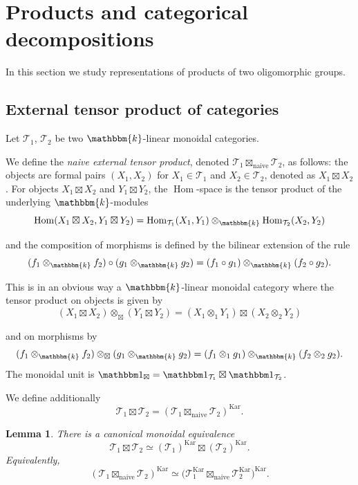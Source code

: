\documentclass[11pt,a4paper]{amsart}
\theoremstyle{plain}%
\newtheorem{lemma}{Lemma}[subsection]
\theoremstyle{definition}
\theoremstyle{remark}
\newcommand{\Hom}{\operatorname{Hom}}
\newcommand{\triv}{{\mathbbm 1}}
\newcommand{\kk}{\mathbbm{k}}
\newcommand{\Kar}{\mathrm{Kar}}
\begin{document}

\section{Products and categorical decompositions}

In this section we study representations of products of two oligomorphic groups.



\subsection{External tensor product of categories}


Let $\mathcal{T}_1$, $\mathcal{T}_2$ be two $\kk$-linear monoidal categories.

We define the \emph{naive external tensor product}, denoted $\mathcal{T}_1 \boxtimes_{\mathrm{naive}} \mathcal{T}_2$, as follows: the objects are formal pairs $(X_1, X_2)$ for $X_1 \in \mathcal{T}_1$ and $X_2 \in \mathcal{T}_2$, denoted as $X_1 \boxtimes X_2$. For objects $X_1 \boxtimes X_2$ and $Y_1 \boxtimes Y_2$, the $\Hom$-space is the tensor product of the underlying $\kk$-modules
\[ \Hom(X_1 \boxtimes X_2, Y_1 \boxtimes Y_2) = \Hom_{\mathcal{T}_1}(X_1, Y_1) \otimes_\kk \Hom_{\mathcal{T}_2}(X_2, Y_2)\]

and the composition of morphisms is defined by the bilinear extension of the rule
\[(f_1 \otimes_\kk f_2) \circ (g_1 \otimes_\kk g_2) = (f_1 \circ g_1) \otimes_\kk (f_2 \circ g_2).\]

This is in an obvious way a $\kk$-linear monoidal category where the tensor product on objects is given by
\[(X_1 \boxtimes X_2) \otimes_{\boxtimes} (Y_1 \boxtimes Y_2) = (X_1 \otimes_1 Y_1) \boxtimes (X_2 \otimes_2 Y_2)\]

and on morphisms by 
\[(f_1 \otimes_\kk f_2) \otimes_{\boxtimes} (g_1 \otimes_\kk g_2) = (f_1 \otimes_1 g_1) \otimes_\kk (f_2 \otimes_2 g_2).\] The monoidal unit is $\triv_{\boxtimes} = \triv_{\mathcal{T}_1} \boxtimes \triv_{\mathcal{T}_2}$.

We define additionally \[\mathcal{T}_1 \boxtimes \mathcal{T}_2 = (\mathcal{T}_1 \boxtimes_{\mathrm{naive}} \mathcal{T}_2)^{\Kar}.\]

\begin{lemma}\label{lem:external-kar}
There is a canonical monoidal equivalence \[ \mathcal{T}_1\boxtimes\mathcal{T}_2 \simeq (\mathcal{T}_1)^{\Kar}\boxtimes (\mathcal{T}_2)^{\Kar}.\]
Equivalently, \[(\mathcal{T}_1\boxtimes_{\mathrm{naive}}\mathcal{T}_2)^{\Kar}
\simeq \bigl(\mathcal{T}_1^{\Kar}\boxtimes_{\mathrm{naive}}\mathcal{T}_2^{\Kar}\bigr)^{\Kar}. \]
\end{lemma}
\end{document}
